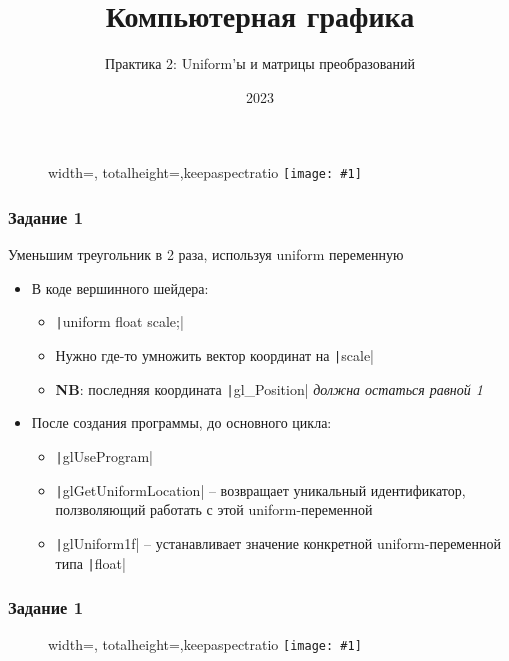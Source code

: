 \documentclass[10pt]{beamer}
\title{Компьютерная графика}
\subtitle{Практика 2: Uniform'ы и матрицы преобразований}
\date{2023}
\newcommand{\slideimage}[1]{
  \begin{figure}
    \begin{adjustbox}{width=\textwidth, totalheight=\textheight-2\baselineskip-2\baselineskip,keepaspectratio}
      \texttt{[image: \#1]}
    \end{adjustbox}
  \end{figure}
}
\begin{document}
\frame{\titlepage}

\begin{frame}
\slideimage{0.png}
\end{frame}

\begin{frame}[fragile]
\frametitle{Задание 1}
Уменьшим треугольник в 2 раза, используя uniform переменную
\begin{itemize}
\item В коде вершинного шейдера:
\begin{itemize}
\item \texttt|uniform float scale;|
\item Нужно где-то умножить вектор координат на \texttt|scale|
\item \textbf{\alert{NB}}: последняя координата \texttt|gl_Position| \textit{должна остаться равной 1}
\end{itemize}
\item После создания программы, до основного цикла:
\begin{itemize}
\item \texttt|glUseProgram|
\item \texttt|glGetUniformLocation| -- возвращает уникальный идентификатор, ползволяющий работать с этой uniform-переменной
\item \texttt|glUniform1f| -- устанавливает значение конкретной uniform-переменной типа \texttt|float|
\end{itemize}
\end{itemize}
\end{frame}

\begin{frame}
\frametitle{Задание 1}
\slideimage{1.png}
\end{frame}
\end{document}
